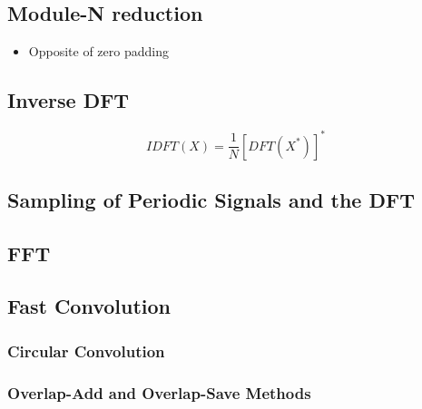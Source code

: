 \subsection{Module-N reduction}
\begin{itemize}
	\item Opposite of zero padding
\end{itemize}


\subsection{Inverse DFT}
\begin{equation}
	IDFT(X) = \frac{1}{N}\left[DFT(X^*)\right]^*
	\label{eq:IDFT}
\end{equation}

\subsection{Sampling of Periodic Signals and the DFT}

\subsection{FFT}

\subsection{Fast Convolution}
\subsubsection{Circular Convolution}
\subsubsection{Overlap-Add and Overlap-Save Methods}


